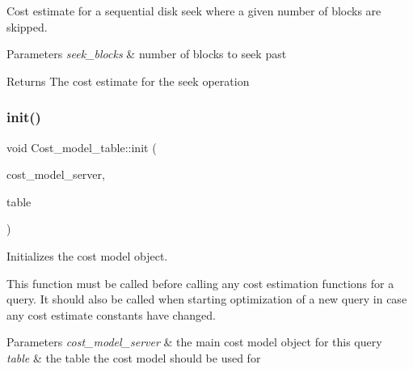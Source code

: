 Cost estimate for a sequential disk seek where a given number of blocks are skipped.


\begin{DoxyParams}{Parameters}
{\em seek\+\_\+blocks} & number of blocks to seek past\\
\hline
\end{DoxyParams}
\begin{DoxyReturn}{Returns}
The cost estimate for the seek operation 
\end{DoxyReturn}
\mbox{\label{classCost__model__table_aa7d9b80473b08cb55eb5b87c788f0274}} 
\subsubsection{\texorpdfstring{init()}{init()}}
{\footnotesize\ttfamily void Cost\+\_\+model\+\_\+table\+::init (\begin{DoxyParamCaption}\item[{const \mbox{\hyperlink{classCost__model__server}{Cost\+\_\+model\+\_\+server}} $\ast$}]{cost\+\_\+model\+\_\+server,  }\item[{const \mbox{\hyperlink{structTABLE}{T\+A\+B\+LE}} $\ast$}]{table }\end{DoxyParamCaption})}

Initializes the cost model object.

This function must be called before calling any cost estimation functions for a query. It should also be called when starting optimization of a new query in case any cost estimate constants have changed.


\begin{DoxyParams}{Parameters}
{\em cost\+\_\+model\+\_\+server} & the main cost model object for this query \\
\hline
{\em table} & the table the cost model should be used for \\
\hline
\end{DoxyParams}
\mbox{\label{classCost__model__table_a334815cfa999a4d55461aec523630a6a}} 
